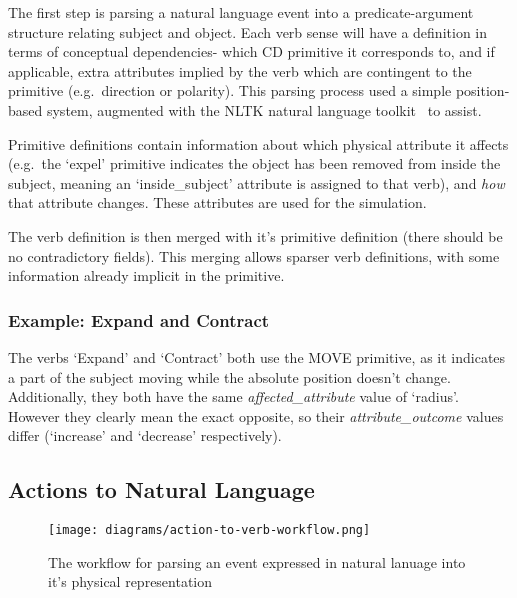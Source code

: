 \documentclass[dissertation.tex]{subfiles}
\begin{document}
    The first step is parsing a natural language event into a predicate-argument structure relating subject and object. Each verb sense will have a definition in terms of conceptual dependencies- which CD primitive it corresponds to, and if applicable, extra attributes implied by the verb which are contingent to the primitive (e.g.~direction or polarity). This parsing process used a simple position-based system, augmented with the NLTK natural language toolkit~\cite{bird2009nltk} to assist.
    
    Primitive definitions contain information about which physical attribute it affects (e.g.~the `expel' primitive indicates the object has been removed from inside the subject, meaning an `inside\_subject' attribute is assigned to that verb), and \emph{how} that attribute changes. These attributes are used for the simulation.
    
    The verb definition is then merged with it's primitive definition (there should be no contradictory fields). This merging allows sparser verb definitions, with some information already implicit in the primitive.

    \subsubsection{Example: Expand and Contract}
    The verbs `Expand' and `Contract' both use the MOVE primitive, as it indicates a part of the subject moving while the absolute position doesn't change. Additionally, they both have the same \emph{affected\_attribute} value of `radius'. However they clearly mean the exact opposite, so their \emph{attribute\_outcome} values differ (`increase' and `decrease' respectively).


    
    \subsection{Actions to Natural Language}
    \begin{figure}[h]
        \begin{center}        
            \texttt{[image: diagrams/action-to-verb-workflow.png]}
        \end{center}
        \caption{The workflow for parsing an event expressed in natural lanuage into it's physical representation}
    \end{figure}
\end{document}
